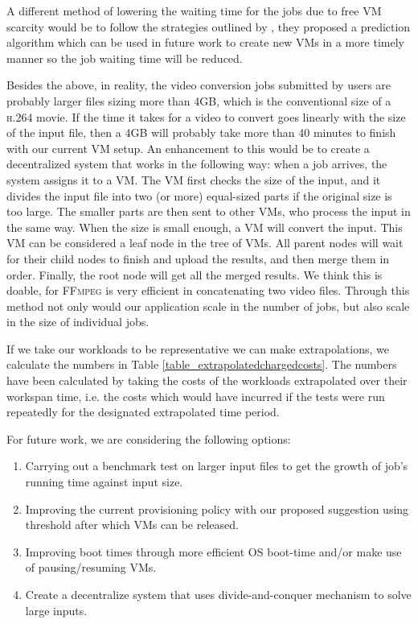 A different method of lowering the waiting time for the jobs due to
free VM scarcity would be to follow the strategies outlined
by \cite{Shen:2011:CER:2038916.2038921}, they proposed a prediction
algorithm which can be used in future work to create new VMs in a more
timely manner so the job waiting time will be reduced.

Besides the above, in reality, the video conversion jobs submitted by
users are probably larger files sizing more than 4GB, which is the
conventional size of a \textsc{h.264} movie. If the time it takes for
a video to convert goes linearly with the size of the input file, then
a 4GB will probably take more than 40 minutes to finish with our
current VM setup. An enhancement to this would be to create a
decentralized system that works in the following way: when a job
arrives, the system assigns it to a VM. The VM first checks the size
of the input, and it divides the input file into two (or more)
equal-sized parts if the original size is too large.  The smaller
parts are then sent to other VMs, who process the input in the same
way. When the size is small enough, a VM will convert the input. This
VM can be considered a leaf node in the tree of VMs. All parent nodes
will wait for their child nodes to finish and upload the results, and
then merge them in order. Finally, the root node will get all the
merged results. We think this is doable, for \textsc{FFmpeg} is very
efficient in concatenating two video files. Through this method not
only would our application scale in the number of jobs, but also scale
in the size of individual jobs.

If we take our workloads to be representative we can make
extrapolations, we calculate the numbers in Table
\ref{table_extrapolatedchargedcosts}. The numbers have been calculated by
taking the costs of the workloads extrapolated over their workspan
time, i.e. the costs which would have incurred if the tests were run
repeatedly for the designated extrapolated time period.


For future work, we are considering the following options:
\begin{enumerate}
\item Carrying out a benchmark test on larger input files to get the
  growth of job's running time against input size.

\item Improving the current provisioning policy with our proposed
  suggestion using threshold after which VMs can be released.
\item Improving boot times through more efficient OS boot-time and/or
  make use of pausing/resuming VMs.

\item Create a decentralize system that uses divide-and-conquer
  mechanism to solve large inputs.

\end{enumerate}



